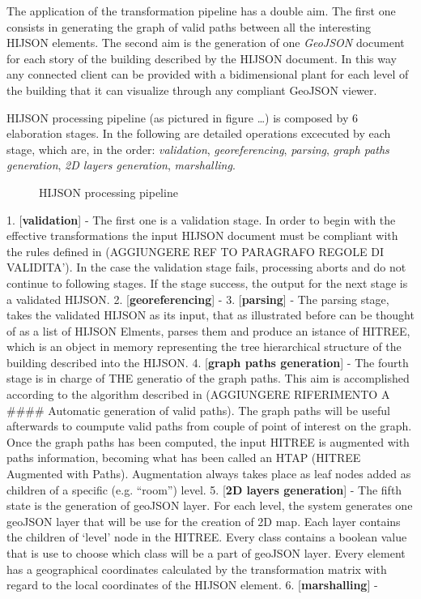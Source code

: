 \documentclass{sig-alternate}
\begin{document}
The application of the transformation pipeline has a double aim. The
first one consists in generating the graph of valid paths between all
the interesting HIJSON elements. The second aim is the generation of one
\emph{GeoJSON} document for each story of the building described by the
HIJSON document. In this way any connected client can be provided with a
bidimensional plant for each level of the building that it can visualize
through any compliant GeoJSON viewer.

HIJSON processing pipeline (as pictured in figure \ldots{}) is composed
by 6 elaboration stages. In the following are detailed operations
excecuted by each stage, which are, in the order: \emph{validation},
\emph{georeferencing}, \emph{parsing}, \emph{graph paths generation},
\emph{2D layers generation}, \emph{marshalling}.

\begin{figure}
\centering
{}
\caption{HIJSON processing pipeline}
\label{fig:pipeline}
\end{figure}

1. {[}\textbf{validation}{]} - The first one is a validation stage. In
order to begin with the effective transformations the input HIJSON
document must be compliant with the rules defined in (AGGIUNGERE REF TO
PARAGRAFO REGOLE DI VALIDITA'). In the case the validation stage fails,
processing aborts and do not continue to following stages. If the stage
success, the output for the next stage is a validated HIJSON. 2.
{[}\textbf{georeferencing}{]} - 3. {[}\textbf{parsing}{]} - The parsing
stage, takes the validated HIJSON as its input, that as illustrated
before can be thought of as a list of HIJSON Elments, parses them and
produce an istance of HITREE, which is an object in memory representing
the tree hierarchical structure of the building described into the
HIJSON. 4. {[}\textbf{graph paths generation}{]} - The fourth stage is
in charge of THE generatio of the graph paths. This aim is accomplished
according to the algorithm described in (AGGIUNGERE RIFERIMENTO A
\#\#\#\# Automatic generation of valid paths). The graph paths will be
useful afterwards to coumpute valid paths from couple of point of
interest on the graph. Once the graph paths has been computed, the input
HITREE is augmented with paths information, becoming what has been
called an HTAP (HITREE Augmented with Paths). Augmentation always takes
place as leaf nodes added as children of a specific (e.g. ``room'')
level. 5. {[}\textbf{2D layers generation}{]} - The fifth state is the
generation of geoJSON layer. For each level, the system generates one
geoJSON layer that will be use for the creation of 2D map. Each layer
contains the children of `level' node in the HITREE. Every class
contains a boolean value that is use to choose which class will be a
part of geoJSON layer. Every element has a geographical coordinates
calculated by the transformation matrix with regard to the local
coordinates of the HIJSON element. 6. {[}\textbf{marshalling}{]} -
\end{document}
